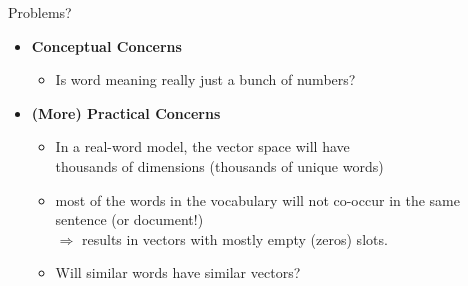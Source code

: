 \documentclass[professionalfonts, xcolor={usenames,svgnames,x11names,table}]{beamer}
\begin{document}
%
%
%
%

\begin{frame}{Problems?}
   \begin{itemize}
        \item \textbf{Conceptual Concerns}
            \begin{itemize}
               	 \item Is word meaning really just a bunch of numbers?
               \end{itemize}
       \end{itemize} 
      
      \vspace{0.3cm} 
      \begin{itemize}           
        \item \textbf{(More) Practical Concerns}
               \begin{itemize}
                \item In a real-word model, the vector space will have\\
                    thousands of dimensions (thousands of unique words)
                    \item most of the words in the vocabulary will not co-occur in the same sentence (or document!)\\
                    $\Rightarrow$ results in vectors with mostly empty (zeros) slots.
                      \item Will similar words have similar vectors?
                         \end{itemize}
                            \end{itemize}

\end{frame}
\end{document}
